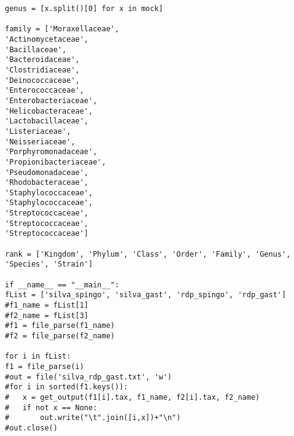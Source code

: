 \begin{verbatim}
genus = [x.split()[0] for x in mock]

family = ['Moraxellaceae',
'Actinomycetaceae',
'Bacillaceae',
'Bacteroidaceae',
'Clostridiaceae',
'Deinococcaceae',
'Enterococcaceae',
'Enterobacteriaceae',
'Helicobacteraceae',
'Lactobacillaceae',
'Listeriaceae',
'Neisseriaceae',
'Porphyromonadaceae',
'Propionibacteriaceae',
'Pseudomonadaceae',
'Rhodobacteraceae',
'Staphylococcaceae',
'Staphylococcaceae',
'Streptococcaceae',
'Streptococcaceae',
'Streptococcaceae']

rank = ['Kingdom', 'Phylum', 'Class', 'Order', 'Family', 'Genus', 'Species', 'Strain']

if __name__ == "__main__":
fList = ['silva_spingo', 'silva_gast', 'rdp_spingo', 'rdp_gast']
#f1_name = fList[1]
#f2_name = fList[3]
#f1 = file_parse(f1_name)
#f2 = file_parse(f2_name)

for i in fList:
f1 = file_parse(i)
#out = file('silva_rdp_gast.txt', 'w')
#for i in sorted(f1.keys()):
#	x = get_output(f1[i].tax, f1_name, f2[i].tax, f2_name)
#	if not x == None:
#		out.write("\t".join([i,x])+"\n")
#out.close()
\end{verbatim}

